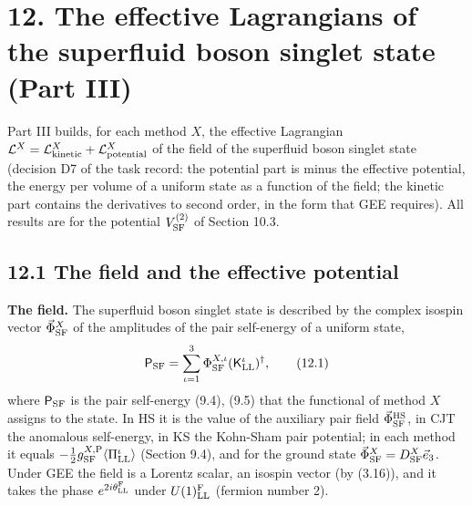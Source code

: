 \documentclass[
  10pt,
]{article}
\begin{document}
\hypertarget{the-effective-lagrangians-of-the-superfluid-boson-singlet-state-part-iii}{%
\section{12. The effective Lagrangians of the superfluid boson singlet
state (Part
III)}\label{the-effective-lagrangians-of-the-superfluid-boson-singlet-state-part-iii}}

Part III builds, for each method \(X\), the effective Lagrangian
\(\mathcal L^X=\mathcal L^X_{\rm kinetic}+\mathcal L^X_{\rm potential}\)
of the field of the superfluid boson singlet state (decision D7 of the
task record: the potential part is minus the effective potential, the
energy per volume of a uniform state as a function of the field; the
kinetic part contains the derivatives to second order, in the form that
GEE requires). All results are for the potential \(V^{(2)}_{\rm SF}\) of
Section 10.3.

\hypertarget{the-field-and-the-effective-potential}{%
\subsection{12.1 The field and the effective
potential}\label{the-field-and-the-effective-potential}}

\textbf{The field.} The superfluid boson singlet state is described by
the complex isospin vector \(\vec\Phi^X_{\rm SF}\) of the amplitudes of
the pair self-energy of a uniform state,
\[\mathsf P_{\rm SF}=\sum_{\iota=1}^3\Phi^{X,\iota}_{\rm SF}(\mathsf K^\iota_{\rm LL})^\dagger,\tag{12.1}\]
where \(\mathsf P_{\rm SF}\) is the pair self-energy (9.4), (9.5) that
the functional of method \(X\) assigns to the state. In HS it is the
value of the auxiliary pair field \(\vec\Phi^{\rm HS}_{\rm SF}\), in CJT
the anomalous self-energy, in KS the Kohn-Sham pair potential; in each
method it equals
\(-\tfrac12g^{X,{\rm P}}_{\rm SF}\langle\Pi^\iota_{\rm LL}\rangle\)
(Section 9.4), and for the ground state
\(\vec\Phi^X_{\rm SF}=D^X_{\rm SF}\vec e_3\). Under GEE the field is a
Lorentz scalar, an isospin vector (by (3.16)), and it takes the phase
\(e^{2i\theta^{\rm F}_{\rm LL}}\) under \(U(1)^{\rm F}_{\rm LL}\)
(fermion number 2).
\end{document}
